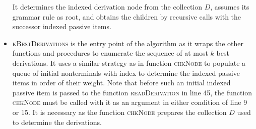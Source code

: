 \documentclass[../../document.tex]{subfiles}
\begin{document}
\begin{itemize}
            It determines the indexed derivation node from the collection \(D\), assumes its grammar rule as root, and obtains the children by recursive calls with the successor indexed passive items.
        \item \textsc{kBestDerivations} is the entry point of the algorithm as it wraps the other functions and procedures to enumerate the sequence of at most \(k\) best derivations.
            It uses a similar strategy as in function \textsc{chkNode} to populate a queue of initial nonterminals with index to determine the indexed passive items in order of their weight.
            Note that before such an initial indexed passive item is passed to the function \textsc{readDerivation} in line 45, the function \textsc{chkNode} must be called with it as an argument in either condition of line 9 or 15.
            It is necessary as the function \textsc{chkNode} prepares the collection \(D\) used to determine the derivations.
    \end{itemize}
\end{document}
